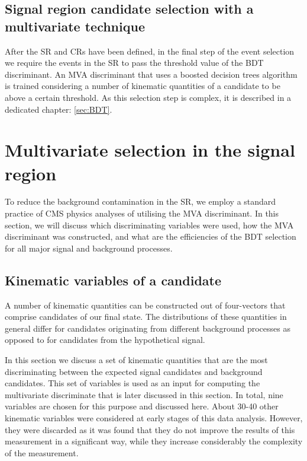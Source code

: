 \subsection{Signal region candidate selection with a multivariate technique}

After the SR and CRs have been defined, in the final step of the event selection we require the events in the SR to pass the threshold value of the BDT discriminant. An MVA discriminant that uses a boosted decision trees algorithm is trained considering a number of kinematic quantities of a candidate to be above a certain threshold. As this selection step is complex, it is described in a dedicated chapter: \ref{sec:BDT}.



\section{Multivariate selection in the signal region}

To reduce the background contamination in the SR, we employ a standard practice of CMS physics analyses of utilising the MVA discriminant. In this section, we will discuss which discriminating variables were used, how the MVA discriminant was constructed, and what are the efficiencies of the BDT selection for all major signal and background processes. 
\label{sec:BDT}


\subsection{Kinematic variables of a candidate}

A  number of kinematic quantities can be constructed out of four-vectors that comprise candidates of our final state.  The distributions of these quantities in general differ for candidates originating from different background processes as opposed to for candidates from the hypothetical signal. 
           
In this section we discuss a set of kinematic quantities that are the most discriminating between the expected signal candidates and background candidates. This set of variables is used as an input for computing the multivariate discriminate that is later discussed in this section. In total, nine variables are chosen for this purpose and discussed here. About 30-40 other kinematic variables were considered at early stages of this data analysis. However, they were discarded as it was found that they do not improve the results of this measurement in a  significant way, while they increase considerably the complexity of the measurement.
           
